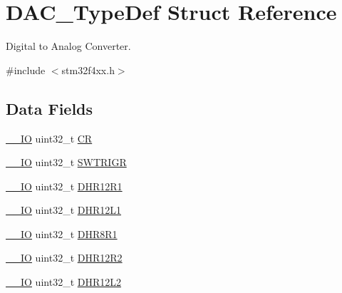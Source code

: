 \hypertarget{struct_d_a_c___type_def}{\section{D\-A\-C\-\_\-\-Type\-Def Struct Reference}
\label{struct_d_a_c___type_def}
}


Digital to Analog Converter.  




{\ttfamily \#include $<$stm32f4xx.\-h$>$}

\subsection*{Data Fields}
\begin{DoxyCompactItemize}
\item 
\hyperlink{group___c_m_s_i_s__core__definitions_gaec43007d9998a0a0e01faede4133d6be}{\-\_\-\-\_\-\-I\-O} uint32\-\_\-t \hyperlink{struct_d_a_c___type_def_ab40c89c59391aaa9d9a8ec011dd0907a}{C\-R}
\item 
\hyperlink{group___c_m_s_i_s__core__definitions_gaec43007d9998a0a0e01faede4133d6be}{\-\_\-\-\_\-\-I\-O} uint32\-\_\-t \hyperlink{struct_d_a_c___type_def_a896bbb7153af0b67ad772360feaceeb4}{S\-W\-T\-R\-I\-G\-R}
\item 
\hyperlink{group___c_m_s_i_s__core__definitions_gaec43007d9998a0a0e01faede4133d6be}{\-\_\-\-\_\-\-I\-O} uint32\-\_\-t \hyperlink{struct_d_a_c___type_def_ac2bb55b037b800a25852736afdd7a258}{D\-H\-R12\-R1}
\item 
\hyperlink{group___c_m_s_i_s__core__definitions_gaec43007d9998a0a0e01faede4133d6be}{\-\_\-\-\_\-\-I\-O} uint32\-\_\-t \hyperlink{struct_d_a_c___type_def_ae9028b8bcb5118b7073165fb50fcd559}{D\-H\-R12\-L1}
\item 
\hyperlink{group___c_m_s_i_s__core__definitions_gaec43007d9998a0a0e01faede4133d6be}{\-\_\-\-\_\-\-I\-O} uint32\-\_\-t \hyperlink{struct_d_a_c___type_def_ad0a200e12acad17a5c7d2059159ea7e1}{D\-H\-R8\-R1}
\item 
\hyperlink{group___c_m_s_i_s__core__definitions_gaec43007d9998a0a0e01faede4133d6be}{\-\_\-\-\_\-\-I\-O} uint32\-\_\-t \hyperlink{struct_d_a_c___type_def_a804c7e15dbb587c7ea25511f6a7809f7}{D\-H\-R12\-R2}
\item 
\hyperlink{group___c_m_s_i_s__core__definitions_gaec43007d9998a0a0e01faede4133d6be}{\-\_\-\-\_\-\-I\-O} uint32\-\_\-t \hyperlink{struct_d_a_c___type_def_a2e45f9c9d67e384187b25334ba0a3e3d}{D\-H\-R12\-L2}
\item 

\end{DoxyCompactItemize}
